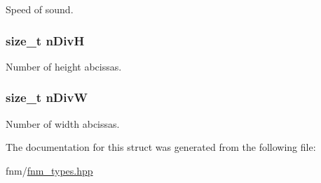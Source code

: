 Speed of sound. 

\hypertarget{structfnm_1_1sysparm__t_a26cce015a626b46108d07cdbab336011}{
\subsubsection[{n\+Div\+H}]{\setlength{\rightskip}{0pt plus 5cm}size\+\_\+t n\+Div\+H}}\label{structfnm_1_1sysparm__t_a26cce015a626b46108d07cdbab336011}


Number of height abcissas. 

\hypertarget{structfnm_1_1sysparm__t_a676de84ecc719ad3223182fb136690af}{
\subsubsection[{n\+Div\+W}]{\setlength{\rightskip}{0pt plus 5cm}size\+\_\+t n\+Div\+W}}\label{structfnm_1_1sysparm__t_a676de84ecc719ad3223182fb136690af}


Number of width abcissas. 



The documentation for this struct was generated from the following file\+:\begin{DoxyCompactItemize}
\item 
fnm/\hyperlink{fnm__types_8hpp}{fnm\+\_\+types.\+hpp}\end{DoxyCompactItemize}
